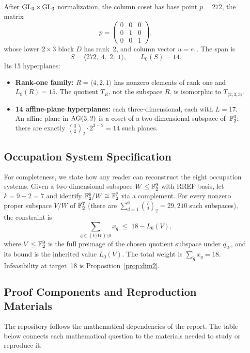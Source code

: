 \documentclass[11pt,a4paper]{article}
\begin{document}
After $\operatorname{GL}_3\times\operatorname{GL}_3$ normalization, the column coset has base point $p=272$, the matrix
\[
  p = \begin{pmatrix} 0&0&0\\ 0&1&0\\ 0&0&1\end{pmatrix},
\]
whose lower $2\times 3$ block $D$ has rank~2, and column vector $u=e_1$.  The span is
\[
  S = \langle 272,\; 4,\; 2,\; 1\rangle,\qquad L_0(S)=14.
\]
Its 15 hyperplanes:
\begin{itemize}
  \item \textbf{Rank-one family:} $R=\langle4,2,1\rangle$ has nonzero elements of rank one and $L_0(R)=15$. The quotient $T_R$, not the subspace $R$, is isomorphic to $T_{\langle2,3,3\rangle}$.
  \item \textbf{14 affine-plane hyperplanes:} each three-dimensional, each with $L=17$.  An affine plane in $\operatorname{AG}(3,2)$ is a coset of a two-dimensional subspace of~$\mathbb{F}_2^3$; there are exactly $\binom{3}{2}_2\cdot 2^{3-2}=14$ such planes.
\end{itemize}

\subsection{Occupation System Specification}

For completeness, we state how any reader can reconstruct the eight occupation systems.  Given a two-dimensional subspace $W\le\mathbb{F}_2^9$ with RREF basis, let $k=9-2=7$ and identify $\mathbb{F}_2^9/W\cong\mathbb{F}_2^7$ via a complement.  For every nonzero proper subspace $V/W$ of $\mathbb{F}_2^7$ (there are $\sum_{d=1}^{6}\binom{7}{d}_2 = 29{,}210$ such subspaces), the constraint is
\[
  \sum_{q\in(V/W)\setminus 0} x_q \;\le\; 18-L_0(V),
\]
where $V\le\mathbb{F}_2^9$ is the full preimage of the chosen quotient subspace under $q_W$, and its bound is the inherited value $L_0(V)$. The total weight is $\sum_qx_q=18$. Infeasibility at target~18 is Proposition~\ref{prop:dim2}.


\subsection{Proof Components and Reproduction Materials}\label{app:repository}

The repository follows the mathematical dependencies of the report.
The table below connects each mathematical question to the materials
needed to study or reproduce it.
\end{document}
